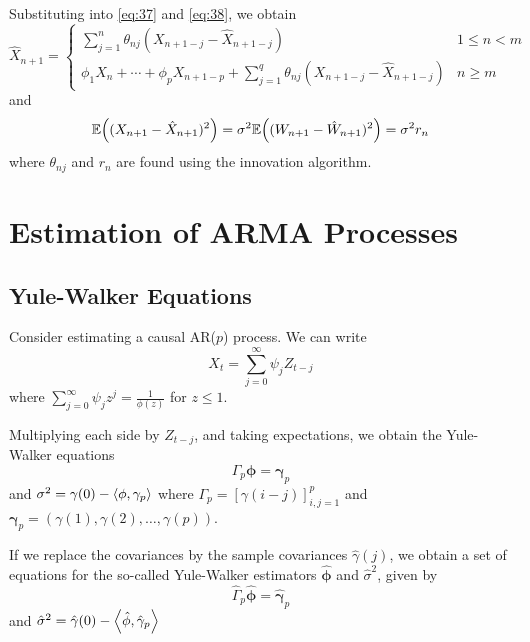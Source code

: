 \begin{lem}
  Substituting into \eqref{eq:37} and \eqref{eq:38}, we obtain
  \begin{equation}
    \label{eq:41}
    \hat X_{n+1} =
    \begin{cases}
      \sum_{j=1}^{n} \theta_{nj}(X_{n+1-j} - \hat X_{n+1-j}) & 1 \leq n < m \\
      \phi_{1} X_{n} + \cdots + \phi_{p} X_{n+1-p} + \sum_{j=1}^{q}
      \theta_{nj}(X_{n+1-j} - \hat X_{n+1-j}) & n \geq m
    \end{cases}
  \end{equation}
  and
  \begin{equation}
    \label{eq:42}
    \E{(X_{n+1} - \hat X_{n+1})^{2}} = \sigma^{2} \E{(W_{n+1} - \hat
      W_{n+1})^{2}} = \sigma^{2} r_{n}
  \end{equation}
  where $\theta_{nj}$ and $r_{n}$ are found using the innovation algorithm.
\end{lem}


\section{Estimation of ARMA Processes}
\label{sec:estim-arma-proc}

\subsection{Yule-Walker Equations}
\label{sec:yule-walk-equat}

Consider estimating a causal AR($p$) process.  We can write
\begin{equation}
  \label{eq:27}
  X_{t} = \sum_{j=0}^{\infty} \psi_{j} Z_{t-j}
\end{equation} where $\sum_{j=0}^{\infty} \psi_{j} z^{j} =
\frac{1}{\phi(z)}$ for $z \leq 1$.

Multiplying each side by $Z_{t-j}$, and taking expectations, we obtain
the Yule-Walker equations
\begin{equation}
  \label{eq:34}
  \Gamma_{p} \mathbf{\phi} = \mathbf{\gamma}_{p}
\end{equation} and $\sigma^{2} = \gamma(0) - \IP{\mathbf{\phi},
  \mathbf{\gamma}_{p}}$ where $\Gamma_{p} = [\gamma(i -j)]^{p}_{i, j =
1}$  and $\mathbf{\gamma}_{p} = (\gamma(1), \gamma(2), \dots,
\gamma(p))$.

If we replace the covariances by the sample covariances $\hat
\gamma(j)$, we obtain a set of equations for the so-called Yule-Walker
estimators $\hat{\mathbf{\phi}}$ and $\hat \sigma^{2}$, given by
\begin{equation}
  \label{eq:43}
  \hat \Gamma_{p} \hat{\mathbf{\phi}} = \hat{\mathbf{\gamma}}_{p}
\end{equation}
and $\hat \sigma^{2} = \hat \gamma(0) - \IP{\hat{\mathbf{\phi}}, \hat{\mathbf{\gamma}}_{p}}$

